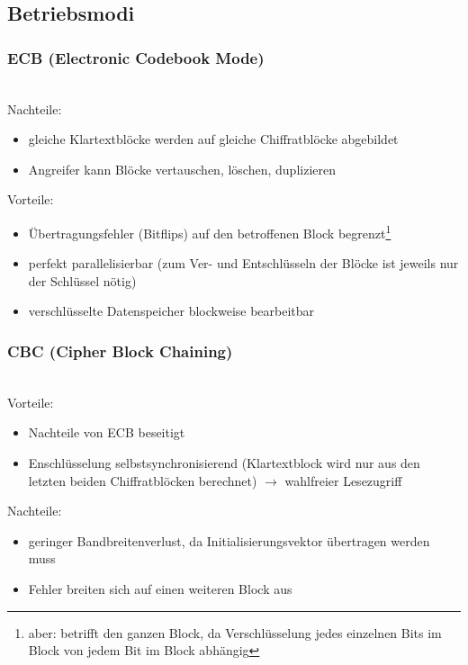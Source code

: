 \documentclass[a4paper,twoside,DIV15,BCOR12mm]{scrbook}
\begin{document}
\subsection{Betriebsmodi}

\subsubsection{ECB (Electronic Codebook Mode)}

\\

Nachteile:

\begin{itemize}
	\item gleiche Klartextblöcke werden auf gleiche Chiffratblöcke abgebildet
	\item Angreifer kann Blöcke vertauschen, löschen, duplizieren
\end{itemize}

Vorteile:

\begin{itemize}
	\item Übertragungsfehler (Bitflips) auf den betroffenen Block begrenzt\footnote{aber: betrifft den ganzen Block, da Verschlüsselung jedes einzelnen Bits im Block von jedem Bit im Block abhängig}
	\item perfekt parallelisierbar (zum Ver- und Entschlüsseln der Blöcke ist jeweils nur der Schlüssel nötig)
	\item verschlüsselte Datenspeicher blockweise bearbeitbar
\end{itemize}

\subsubsection{CBC (Cipher Block Chaining)}

\\

Vorteile:

\begin{itemize}
	\item Nachteile von ECB beseitigt
	\item Enschlüsselung selbstsynchronisierend (Klartextblock wird nur aus den letzten beiden Chiffratblöcken berechnet) $\rightarrow$ wahlfreier Lesezugriff
\end{itemize}

Nachteile:

\begin{itemize}
	\item geringer Bandbreitenverlust, da Initialisierungsvektor übertragen werden muss
	\item Fehler breiten sich auf einen weiteren Block aus
\end{itemize}
\end{document}
